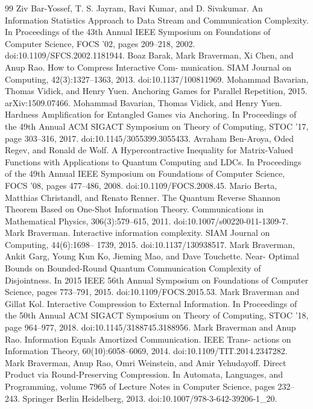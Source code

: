 \documentclass[10pt,a4paper]{article}
\begin{document}
\begin{thebibliography}{99}
 Ziv Bar-Yossef, T. S. Jayram, Ravi Kumar, and D. Sivakumar. An Information Statistics Approach to Data Stream and Communication Complexity. In Proceedings of the 43th Annual IEEE Symposium on Foundations of Computer Science, FOCS ’02, pages 209–218, 2002. doi:10.1109/SFCS.2002.1181944.
 Boaz Barak, Mark Braverman, Xi Chen, and Anup Rao. How to Compress Interactive Com- munication. SIAM Journal on Computing, 42(3):1327–1363, 2013. doi:10.1137/100811969.
 Mohammad Bavarian, Thomas Vidick, and Henry Yuen. Anchoring Games for Parallel Repetition, 2015. arXiv:1509.07466.
 Mohammad Bavarian, Thomas Vidick, and Henry Yuen. Hardness Amplification for Entangled Games via Anchoring. In Proceedings of the 49th Annual ACM SIGACT Symposium on Theory of Computing, STOC ’17, page 303–316, 2017. doi:10.1145/3055399.3055433.
 Avraham Ben-Aroya, Oded Regev, and Ronald de Wolf. A Hypercontractive Inequality for Matrix-Valued Functions with Applications to Quantum Computing and LDCs. In Proceedings of the 49th Annual IEEE Symposium on Foundations of Computer Science, FOCS ’08, pages 477–486, 2008. doi:10.1109/FOCS.2008.45.
 Mario Berta, Matthias Christandl, and Renato Renner. The Quantum Reverse Shannon Theorem Based on One-Shot Information Theory. Communications in Mathematical Physics, 306(3):579–615, 2011. doi:10.1007/s00220-011-1309-7.
 Mark Braverman. Interactive information complexity. SIAM Journal on Computing, 44(6):1698– 1739, 2015. doi:10.1137/130938517.
 Mark Braverman, Ankit Garg, Young Kun Ko, Jieming Mao, and Dave Touchette. Near- Optimal Bounds on Bounded-Round Quantum Communication Complexity of Disjointness. In 2015 IEEE 56th Annual Symposium on Foundations of Computer Science, pages 773–791, 2015. doi:10.1109/FOCS.2015.53.
 Mark Braverman and Gillat Kol. Interactive Compression to External Information. In Proceedings of the 50th Annual ACM SIGACT Symposium on Theory of Computing, STOC ’18, page 964–977, 2018. doi:10.1145/3188745.3188956.
 Mark Braverman and Anup Rao. Information Equals Amortized Communication. IEEE Trans- actions on Information Theory, 60(10):6058–6069, 2014. doi:10.1109/TIT.2014.2347282.
 Mark Braverman, Anup Rao, Omri Weinstein, and Amir Yehudayoff. Direct Product via Round-Preserving Compression. In Automata, Languages, and Programming, volume 7965 of Lecture Notes in Computer Science, pages 232–243. Springer Berlin Heidelberg, 2013. doi:10.1007/978-3-642-39206-1\_20.

\end{thebibliography}
\end{document}
